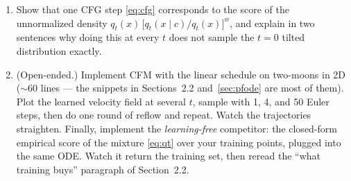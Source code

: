 \documentclass[10pt,a4paper]{article}
\begin{document}
\begin{enumerate}
of the previous problem the probability-flow ODE is linear with a known
solution. Implement Euler, Heun, and DDIM \eqref{eq:ddim} with both
uniform-$t$ and uniform log-SNR grids; measure endpoint error against
the exact flow and reproduce the qualitative content of
Figure~\ref{fig:solvers}. Verify numerically that DDIM becomes exact as
$s \to 0$ (Exercise~\ref{ex:ddim-exact}). Then add the divergence as an
extra integrated state, as in \eqref{eq:likelihood}, and check the
recovered $\log p_0$ against the closed-form Gaussian log-density ---
first with the exact divergence, then with Hutchinson's estimator.
\item Show that one CFG step \eqref{eq:cfg} corresponds to the score of
the unnormalized density $q_t(x)\,\big[q_t(x \mid c)/q_t(x)\big]^w$, and
explain in two sentences why doing this at every $t$ does not sample the
$t = 0$ tilted distribution exactly.
\item (Open-ended.) Implement CFM with the linear schedule on
two-moons in 2D ($\sim$60 lines --- the snippets in Sections~2.2
and~\ref{sec:pfode} are most of them). Plot the learned velocity field at
several $t$, sample with 1, 4, and 50 Euler steps, then do one round of
reflow and repeat. Watch the trajectories straighten. Finally,
implement the \emph{learning-free} competitor: the closed-form
empirical score of the mixture \eqref{eq:qt} over your training points,
plugged into the same ODE. Watch it return the training set, then
reread the ``what training buys'' paragraph of Section~2.2.
\end{enumerate}
\end{document}
